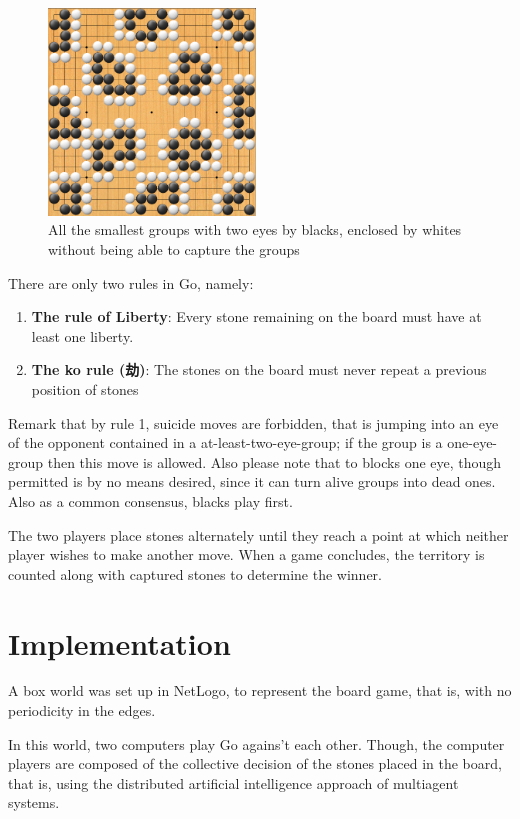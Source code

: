 \documentclass[a4paper,10pt,twocolumn]{article}
\begin{document}
\begin{CJK*}{UTF8}{gbsn}
\begin{figure}[!ht]
\begin{center}
\includegraphics[width=5.5cm]{eyes.png}
\caption{\footnotesize All the smallest groups with two eyes by blacks, enclosed by whites without being able to capture the groups \label{f1}}
\end{center}
\end{figure}

There are only two rules in Go, namely: 

\begin{enumerate}
\item \textbf{The rule of Liberty}: Every stone remaining on the board must have at least one liberty.
\item \textbf{The ko rule (劫)}: The stones on the board must never repeat a previous position of stones
\end{enumerate}

Remark that by rule 1, suicide moves are forbidden, that is jumping into an eye of the opponent contained in a at-least-two-eye-group; if the group is a one-eye-group then this move is allowed. Also please note that to blocks one eye, though permitted is by no means desired, since it can turn alive groups into dead ones. Also as a common consensus, blacks play first.   

The two players place stones alternately until they reach a point at which neither player wishes to make another move. When a game concludes, the territory is counted along with captured stones to determine the winner. 

\section{Implementation}
A box world was set up in NetLogo, to represent the board game, that is, with no periodicity in the edges.  

In this world, two computers play Go agains't each other. Though, the computer players are composed of the collective decision of the stones placed in the board, that is, using the distributed artificial intelligence approach of multiagent systems. 


\end{CJK*}
\end{document}
